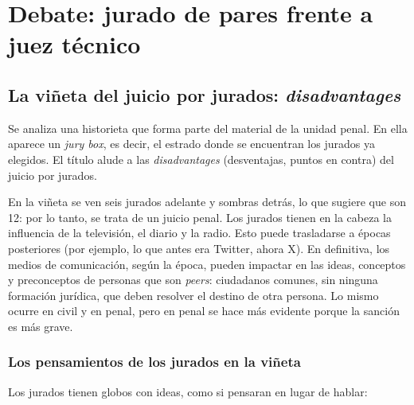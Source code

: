 \documentclass[12pt,oneside]{book}
\begin{document}
\chapter[Debate: jurado de pares vs. juez técnico]{Debate: jurado de pares frente a juez técnico}

\section{La viñeta del juicio por jurados: \textit{disadvantages}}

Se analiza una historieta que forma parte del material de la unidad penal. En ella aparece un \textit{jury box}, es decir, el estrado donde se encuentran los jurados ya elegidos. El título alude a las \textit{disadvantages} (desventajas, puntos en contra) del juicio por jurados.

En la viñeta se ven seis jurados adelante y sombras detrás, lo que sugiere que son 12: por lo tanto, se trata de un juicio penal. Los jurados tienen en la cabeza la influencia de la televisión, el diario y la radio. Esto puede trasladarse a épocas posteriores (por ejemplo, lo que antes era Twitter, ahora X). En definitiva, los medios de comunicación, según la época, pueden impactar en las ideas, conceptos y preconceptos de personas que son \textit{peers}: ciudadanos comunes, sin ninguna formación jurídica, que deben resolver el destino de otra persona. Lo mismo ocurre en civil y en penal, pero en penal se hace más evidente porque la sanción es más grave.

\subsection{Los pensamientos de los jurados en la viñeta}

Los jurados tienen globos con ideas, como si pensaran en lugar de hablar:
\end{document}
